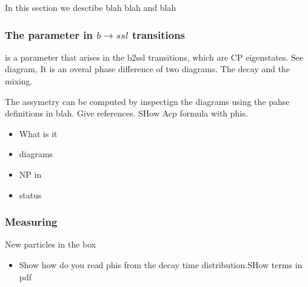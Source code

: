 

{\color{red}In this section we desctibe blah blah and blah}

\subsubsection{The \phis parameter in $b \rightarrow ssl$ transitions}
\phis is a parameter that arises in the b2ssl transitions, which are CP eigenstates.
See diagram,
It is an overal phase difference of two diagrams. The decay and the mixing.

The assymetry can be computed by inspectign the diagrams using the pahse definitions in blah.
Give references.
SHow Acp formula with phis.


\begin{itemize}
  \item What is it
  \item diagrams
  \item NP in \phis
  \item \phis status
\end{itemize}

\subsubsection{Measuring \phis}
New particles in the box


\begin{itemize}
  \item Show how do you read phis from the decay time distribution.SHow terms in pdf
\end{itemize}
